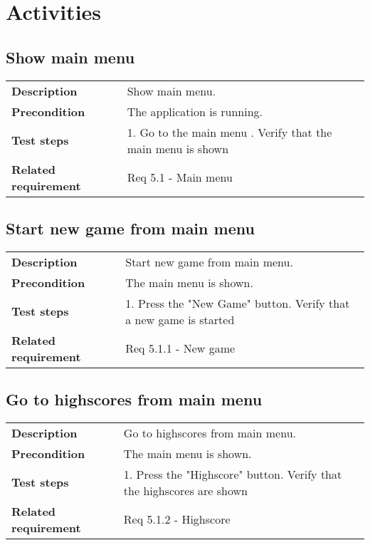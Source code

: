 \documentclass[a4paper,titlepage]{article}
\begin{document}
\newpage
\section{Activities}
\subsection{Show main menu}
\begin{tabularx}{\textwidth}{lX}
	\textbf{Description}	&
		Show main menu.\\
	\textbf{Precondition}	&
		The application is running.\\
	\textbf{Test steps}	&
		1. Go to the main menu \newline
		2. Verify that the main menu is shown \\
	\textbf{Related requirement}	&
		Req 5.1 - Main menu \\
\end{tabularx}

\subsection{Start new game from main menu}
\begin{tabularx}{\textwidth}{lX}
	\textbf{Description}	&
		Start new game from main menu.\\
	\textbf{Precondition}	&
		The main menu is shown.\\
	\textbf{Test steps}	&
		1.  Press the "New Game" button\newline
		2.  Verify that a new game is started\\
	\textbf{Related requirement}	&
		Req 5.1.1 - New game \\
\end{tabularx}

\subsection{Go to highscores from main menu}
\begin{tabularx}{\textwidth}{lX}
	\textbf{Description}	&
		Go to highscores from main menu.\\
	\textbf{Precondition}	&
		The main menu is shown.\\
	\textbf{Test steps}	&
		1. Press the "Highscore" button\newline
		2. Verify that the highscores are shown\\
	\textbf{Related requirement}	&
		Req 5.1.2 - Highscore \\
\end{tabularx}
\end{document}
